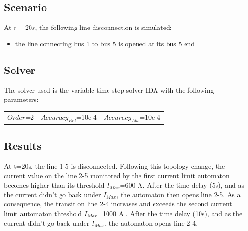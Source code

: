 \documentclass[a4paper, 12pt]{report}
\begin{document}
\subsection{Scenario}
At $t=20s$, the following line disconnection is simulated:
\begin{itemize}
\item{the line connecting bus 1 to bus 5 is opened at its bus 5 end}
\end{itemize}

\subsection{Solver}
The solver used is the variable time step solver IDA with the following parameters:
\begin{center}
\begin{tabular}{l|l|l}
   $Order$=2 & $Accuracy_{Rel}$=10e-4 & $Accuracy_{Abs}$=10e-4 \\
\end{tabular}
\end{center}


\newpage
\subsection{Results}

At t=20s, the line 1-5 is disconnected. Following this topology change, the current value on the line 2-5 monitored by the first current limit automaton becomes higher than its threshold $I_{Max}$=600 A. After the time delay (5s), and as the current didn't go back under $I_{Max}$, the automaton then opens line 2-5.
As a consequence, the transit on line 2-4 increases and exceeds the second current limit automaton threshold $I_{Max}$=1000 A . After the time delay (10s), and as the current didn't go back under $I_{Max}$, the automaton opens line 2-4. \\
\end{document}
